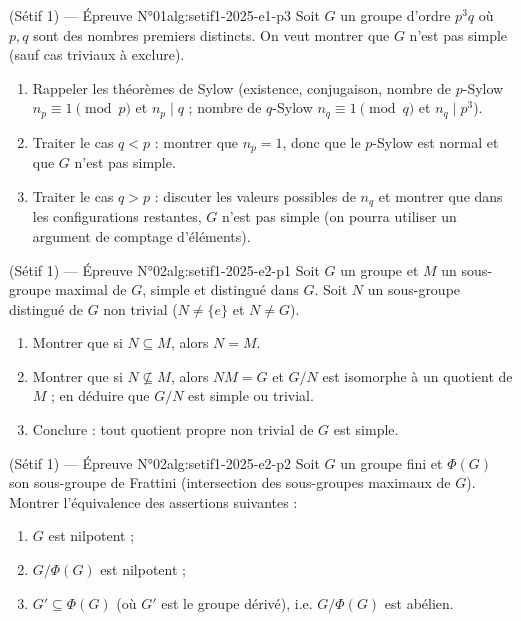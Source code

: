 \begin{problem}{(Sétif 1) — Épreuve N°01}{alg:setif1-2025-e1-p3}
Soit $G$ un groupe d'ordre $p^3q$ où $p,q$ sont des nombres premiers distincts. On
veut montrer que $G$ n'est pas simple (sauf cas triviaux à exclure).
\begin{enumerate}
\item Rappeler les théorèmes de Sylow (existence, conjugaison, nombre de $p$-Sylow
      $n_p\equiv1\pmod p$ et $n_p\mid q$ ; nombre de $q$-Sylow
      $n_q\equiv1\pmod q$ et $n_q\mid p^3$).
\item Traiter le cas $q<p$ : montrer que $n_p=1$, donc que le $p$-Sylow est normal
      et que $G$ n'est pas simple.
\item Traiter le cas $q>p$ : discuter les valeurs possibles de $n_q$ et montrer que
      dans les configurations restantes, $G$ n'est pas simple (on pourra utiliser un
      argument de comptage d'éléments).
\end{enumerate}

\end{problem}

\newpage

\begin{problem}{(Sétif 1) — Épreuve N°02}{alg:setif1-2025-e2-p1}
Soit $G$ un groupe et $M$ un sous-groupe maximal de $G$, simple et distingué dans
$G$. Soit $N$ un sous-groupe distingué de $G$ non trivial ($N\neq\{e\}$ et
$N\neq G$).
\begin{enumerate}
\item Montrer que si $N\subseteq M$, alors $N=M$.
\item Montrer que si $N\not\subseteq M$, alors $NM=G$ et $G/N$ est isomorphe à un
      quotient de $M$ ; en déduire que $G/N$ est simple ou trivial.
\item Conclure : tout quotient propre non trivial de $G$ est simple.
\end{enumerate}

\end{problem}

\newpage

\begin{problem}{(Sétif 1) — Épreuve N°02}{alg:setif1-2025-e2-p2}
Soit $G$ un groupe fini et $\Phi(G)$ son sous-groupe de Frattini (intersection des
sous-groupes maximaux de $G$). Montrer l'équivalence des assertions suivantes :
\begin{enumerate}
\item $G$ est nilpotent ;
\item $G/\Phi(G)$ est nilpotent ;
\item $G'\subseteq\Phi(G)$ (où $G'$ est le groupe dérivé), i.e. $G/\Phi(G)$ est
      abélien.
\end{enumerate}

\end{problem}

